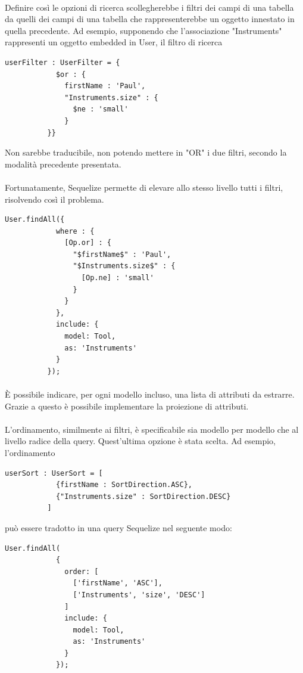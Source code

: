 \documentclass[a4paper, 12pt]{report}
\begin{document}
        \paragraph*{}
        Definire così le opzioni di ricerca scollegherebbe i filtri dei campi di una tabella da quelli dei campi di una tabella che rappresenterebbe un oggetto innestato in quella precedente.
        Ad esempio, supponendo che l'associazione "Instruments" rappresenti un oggetto embedded in User, il filtro di ricerca
        \begin{Verbatim}[samepage=true]
          userFilter : UserFilter = {
            $or : {
              firstName : 'Paul', 
              "Instruments.size" : {
                $ne : 'small'
              }
          }}
        \end{Verbatim}
        Non sarebbe traducibile, non potendo mettere in "OR" i due filtri, secondo la modalità precedente presentata.
        \paragraph*{} 
        Fortunatamente, Sequelize permette di elevare allo stesso livello tutti i filtri, risolvendo così il problema.
        \begin{Verbatim}[samepage=true]
          User.findAll({
            where : {
              [Op.or] : {
                "$firstName$" : 'Paul', 
                "$Instruments.size$" : {
                  [Op.ne] : 'small'
                }
              }
            },
            include: {
              model: Tool,
              as: 'Instruments'
            }
          });
        \end{Verbatim}
        \paragraph*{}
        È possibile indicare, per ogni modello incluso, una lista di attributi da estrarre. Grazie a questo è possibile implementare la proiezione di attributi.
        \paragraph*{}
        L'ordinamento, similmente ai filtri, è specificabile sia modello per modello che al livello radice della query. Quest'ultima opzione è stata scelta.
        Ad esempio, l'ordinamento
        \begin{Verbatim}[samepage=true]
          userSort : UserSort = [
            {firstName : SortDirection.ASC},
            {"Instruments.size" : SortDirection.DESC}
          ]
        \end{Verbatim}
        può essere tradotto in una query Sequelize nel seguente modo:
        \begin{Verbatim}[samepage=true]
          User.findAll(
            {
              order: [
                ['firstName', 'ASC'],
                ['Instruments', 'size', 'DESC']
              ]
              include: {
                model: Tool,
                as: 'Instruments'
              }
            });
        \end{Verbatim}
\end{document}
